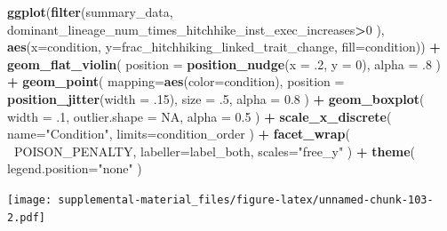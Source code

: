\documentclass[]{book}
\newenvironment{Shaded}{\begin{snugshade}}{\end{snugshade}}
\newcommand{\DataTypeTok}[1]{\textcolor[rgb]{0.13,0.29,0.53}{#1}}
\newcommand{\DecValTok}[1]{\textcolor[rgb]{0.00,0.00,0.81}{#1}}
\newcommand{\FloatTok}[1]{\textcolor[rgb]{0.00,0.00,0.81}{#1}}
\newcommand{\KeywordTok}[1]{\textcolor[rgb]{0.13,0.29,0.53}{\textbf{#1}}}
\newcommand{\NormalTok}[1]{#1}
\newcommand{\OperatorTok}[1]{\textcolor[rgb]{0.81,0.36,0.00}{\textbf{#1}}}
\newcommand{\OtherTok}[1]{\textcolor[rgb]{0.56,0.35,0.01}{#1}}
\newcommand{\StringTok}[1]{\textcolor[rgb]{0.31,0.60,0.02}{#1}}
\begin{document}
\begin{Shaded}
\begin{Highlighting}[]
\KeywordTok{ggplot}\NormalTok{(}\KeywordTok{filter}\NormalTok{(summary_data, dominant_lineage_num_times_hitchhike_inst_exec_increases}\OperatorTok{>}\DecValTok{0}\NormalTok{ ), }\KeywordTok{aes}\NormalTok{(}\DataTypeTok{x=}\NormalTok{condition, }\DataTypeTok{y=}\NormalTok{frac_hitchhiking_linked_trait_change, }\DataTypeTok{fill=}\NormalTok{condition)) }\OperatorTok{+}
\StringTok{  }\KeywordTok{geom_flat_violin}\NormalTok{(}
    \DataTypeTok{position =} \KeywordTok{position_nudge}\NormalTok{(}\DataTypeTok{x =} \FloatTok{.2}\NormalTok{, }\DataTypeTok{y =} \DecValTok{0}\NormalTok{),}
    \DataTypeTok{alpha =} \FloatTok{.8}
\NormalTok{  ) }\OperatorTok{+}
\StringTok{  }\KeywordTok{geom_point}\NormalTok{(}
    \DataTypeTok{mapping=}\KeywordTok{aes}\NormalTok{(}\DataTypeTok{color=}\NormalTok{condition),}
    \DataTypeTok{position =} \KeywordTok{position_jitter}\NormalTok{(}\DataTypeTok{width =} \FloatTok{.15}\NormalTok{),}
    \DataTypeTok{size =} \FloatTok{.5}\NormalTok{,}
    \DataTypeTok{alpha =} \FloatTok{0.8}
\NormalTok{  ) }\OperatorTok{+}
\StringTok{  }\KeywordTok{geom_boxplot}\NormalTok{(}
    \DataTypeTok{width =} \FloatTok{.1}\NormalTok{,}
    \DataTypeTok{outlier.shape =} \OtherTok{NA}\NormalTok{,}
    \DataTypeTok{alpha =} \FloatTok{0.5}
\NormalTok{  ) }\OperatorTok{+}
\StringTok{  }\KeywordTok{scale_x_discrete}\NormalTok{(}
    \DataTypeTok{name=}\StringTok{"Condition"}\NormalTok{,}
    \DataTypeTok{limits=}\NormalTok{condition_order}
\NormalTok{  ) }\OperatorTok{+}
\StringTok{  }\KeywordTok{facet_wrap}\NormalTok{(}
    \OperatorTok{~}\NormalTok{POISON_PENALTY,}
    \DataTypeTok{labeller=}\NormalTok{label_both,}
    \DataTypeTok{scales=}\StringTok{"free_y"}
\NormalTok{  ) }\OperatorTok{+}
\StringTok{  }\KeywordTok{theme}\NormalTok{(}
    \DataTypeTok{legend.position=}\StringTok{"none"}
\NormalTok{  )}
\end{Highlighting}
\end{Shaded}

\texttt{[image: supplemental-material\_files/figure-latex/unnamed-chunk-103-2.pdf]}
\end{document}
